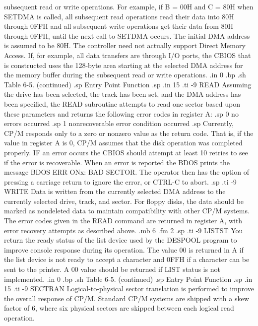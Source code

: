 subsequent read or write operations.  For example, if B = 00H and C = 80H
when SETDMA is called, all subsequent read operations read their data into
80H through 0FFH and all subsequent write operations get their
data from 80H through 0FFH, until the next call
to SETDMA occurs.  The initial DMA address is 
assumed to be 80H.  The controller need not
actually support Direct Memory Access.  If,
for example, all data transfers are through I/O
ports, the CBIOS that is constructed uses
the 128-byte area starting at the selected DMA
address for the memory buffer during the 
subsequent read or write operations.
.in 0
.bp
.sh
                     Table 6-5.  (continued)
.sp
   Entry Point                    Function
.sp
.in 15
.ti -9
READ     Assuming the drive has been selected, the track
has been set, and the DMA address has been 
specified, the READ subroutine attempts to
read one sector based upon these parameters
and returns the following error codes in 
register A:
.sp
0  no errors occurred
.sp
1  nonrecoverable error condition occurred
.sp
Currently, CP/M responds only to a zero or nonzero
value as the return code.  That is, if the
value in register A is 0, CP/M assumes that the 
disk operation was completed properly.  IF an
error occurs the CBIOS should attempt
at least 10 retries to see if the error is
recoverable.  When an error is reported the BDOS
prints the message BDOS ERR ONx:  BAD
SECTOR.  The operator then has the option of
pressing a carriage return to ignore the error, or
CTRL-C to abort.
.sp
.ti -9
WRITE    Data is written from the currently 
selected DMA address to the currently selected
drive, track, and sector.  For floppy disks, the 
data should be marked as nondeleted data to 
maintain compatibility with other CP/M systems.
The error codes given in the READ command are
returned in register A, with error recovery 
attempts as described above.
.mb 6
.fm 2
.sp
.ti -9
LISTST   You return the ready status of the list
device used by the DESPOOL program to improve
console response during its operation.  The 
value 00 is returned in A if the list device is 
not ready to accept a character and 0FFH if a 
character can be sent to the printer.  A 00 
value should be returned if LIST status is not
implemented.
.in 0
.bp
.sh
                     Table 6-5.  (continued)
.sp
   Entry Point                    Function
.sp
.in 15
.ti -9
SECTRAN  Logical-to-physical sector
translation is performed to improve the overall response of
CP/M.  Standard CP/M systems are shipped with a 
skew factor of 6, where six physical sectors are 
skipped between each logical read operation.
